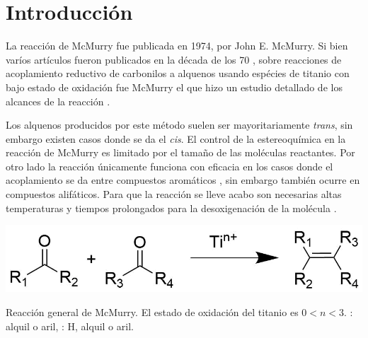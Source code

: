 \documentclass[fleqn,11pt]{SelfArx}
\begin{document}
\flushbottom %

\maketitle %


\thispagestyle{empty} %


\section*{Introducci\'on} %

La reacci\'on de McMurry fue publicada en 1974, por John E. McMurry. Si bien var\'ios art\'iculos fueron publicados en la d\'ecada de los 70 \cite{Mukaiyama1973, Mukaiyama1974}, sobre reacciones de acoplamiento reductivo de carbonilos a alquenos usando esp\'ecies de titanio con bajo estado de oxidaci\'on fue McMurry el que hizo un estudio detallado de los alcances de la reacci\'on \cite{Wang2010}.

Los alquenos producidos por este m\'etodo suelen ser mayoritariamente \textit{trans}, sin embargo existen casos donde se da el \textit{cis}. El control de la estereoqu\'imica en la reacci\'on de McMurry es limitado por el tama\~no de las mol\'eculas reactantes. Por otro lado la reacci\'on \'unicamente funciona con eficacia en los casos donde el acoplamiento se da entre compuestos arom\'aticos \cite{Wang2010}, sin embargo tambi\'en ocurre en compuestos alif\'aticos. Para que la reacci\'on se lleve acabo son necesarias altas temperaturas y tiempos prolongados para la desoxigenaci\'on de la mol\'ecula \cite{Wang2010, Villiers1997}.

\begin{scheme}[h]
	\centering
	\includegraphics[width=0.9\linewidth]{structures/generalreaction.png}
	\caption{Reacci\'on general de McMurry. El estado de oxidaci\'on del titanio es $0<n<3$. : alquil o aril, : H, alquil o aril. \cite{Wang2010}}
\end{scheme}
\end{document}
